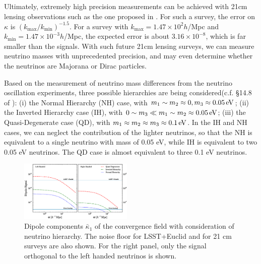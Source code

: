 \documentclass[aps,prl,twocolumn,showpacs,superscriptaddress,groupedaddress,nofootinbib]{revtex4}  %
\newcommand{\mr}{\mathrm}
\newcommand{\eV}{\ensuremath{\,{\rm eV}}}
\begin{document}
Ultimately, extremely high precision measurements can be achieved with
21cm lensing observations such as the one proposed in \cite{KiyoUeLi}.
For such a survey, the error on $\kappa$ is $(k_\mr{max}/k_\mr{min})^{-1.5}$.  
For a survey with $k_\mr{max}=1.47\times10^2h$/Mpc and
$k_\mr{min}=1.47\times10^{-3}h$/Mpc, the expected error is about
$3.16\times10^{-8}$, which is far smaller than the signals. With such
future 21cm lensing surveys, we can measure neutrino masses with
unprecedented precision, and may even determine whether the neutrinos  
are Majorana or Dirac particles.

Based on the measurement of neutrino mass differences from the neutrino
oscillation experiments, three possible hierarchies are being considered(c.f.
\S 14.8 of \cite{2014ChPhC..38i0001O}):
(i) the Normal Hierarchy (NH) case, with $m_1\sim m_2 \approx 0, m_3 \approx 
0.05 \eV$; (ii) the Inverted Hierarchy case (IH), with 
$0 \sim m_3 \ll m_1 \sim m_2 \approx 0.05 \eV$;
(iii) the Quasi-Degenerate case (QD), with
 $m_1 \approx m_2 \approx m_3 \approx 0.1\eV$. 
In the IH and NH cases, we can neglect the contribution of the 
lighter neutrinos, so that the NH is equivalent to a single neutrino 
with mass of 0.05 eV, while IH is equivalent to two 0.05 eV neutrinos.
The QD case is almost equivalent to three 0.1 eV neutrinos.

\begin{figure}[tbp]
  \begin{center}
    \includegraphics[width=0.48\textwidth]{fig_4.eps}
  \end{center}
  \vspace{-0.7cm}
  \caption{\label{fig:kappa1} Dipole components $\bar{\kappa}_1$ 
    of the convergence
    field with consideration of neutrino hierarchy.  The noise floor
    for LSST+Euclid and for 21 cm surveys are also shown.   For the
    right panel, only the signal orthogonal to the left handed
    neutrinos is shown.
}
\end{figure}
\end{document}
